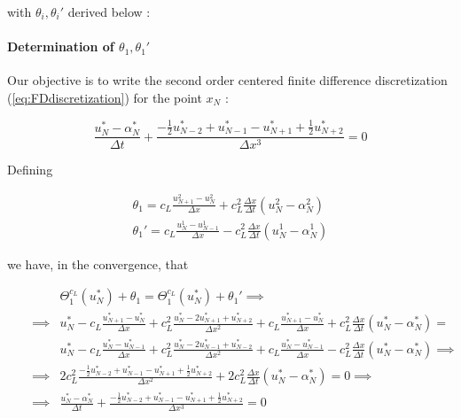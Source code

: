 \noindent with $\theta_i, \theta_i'$ derived below : 


\paragraph{Determination of $\theta_1, \theta_1'$}

\indent Our objective is to write the second order centered finite difference discretization (\ref{eq:FDdiscretization}) for the point $x_{N}$ :

\begin{equation}
    \label{eq:FDdiscretizationN}
    \frac{u_{N}^* - \alpha_{N}^*}{\Delta t} + \frac{-\frac{1}{2}u_{N-2}^* + u_{N-1}^* - u_{N+1}^* + \frac{1}{2}u_{N+2}^* }{\Delta x ^3} = 0
\end{equation}

\indent Defining 

\begin{gather}
    \theta_1 = c_L \frac{u_{N+1}^2 - u_{N}^2}{\Delta x} + c_L^2\frac{\Delta x}{\Delta t} \left( u_{N}^2 - \alpha_{N}^2 \right)\\
    \theta_1' = c_L \frac{u_{N}^1 - u_{N-1}^1}{\Delta x} - c_L^2\frac{\Delta x}{\Delta t} \left( u_{N}^1 - \alpha_{N}^1 \right)
\end{gather}

\indent we have, in the convergence, that

\begin{equation}
\label{eq:modifiedTBC1}
\begin{aligned}
&& &    \Theta_1^{c_L}(u_N^*) + \theta_1 = \Theta_1^{c_L}(u_N^*) + \theta_1'\implies \\
&& \implies &    u_N^* - c_L \frac{u_{N+1}^* - u_N^*}{\Delta x} + c_L^2\frac{u_N^* - 2u_{N+1}^* + u_{N+2}^*}{\Delta x^2} + c_L \frac{u_{N+1}^* - u_{N}^*}{\Delta x} + c_L^2\frac{\Delta x}{\Delta t} \left( u_{N}^* - \alpha_{N}^* \right) = \\
&& & u_N^* - c_L \frac{u_{N}^* - u_{N-1}^*}{\Delta x} + c_L^2\frac{u_N^* - 2u_{N-1}^* + u_{N-2}^*}{\Delta x^2} + c_L \frac{u_{N}^* - u_{N-1}^*}{\Delta x} - c_L^2\frac{\Delta x}{\Delta t} \left( u_{N}^* - \alpha_{N}^* \right) \implies \\
 && \implies &    2c_L^2 \frac{-\frac{1}{2}u_{N-2}^* + u_{N-1}^* - u_{N+1}^* + \frac{1}{2}u_{N+2}^* }{\Delta x ^2}  +             2c_L^2\frac{\Delta x}{\Delta t} \left( u_{N}^* - \alpha_{N}^* \right) = 0 \implies \\
&& \implies &    \frac{u_{N}^* - \alpha_{N}^*}{\Delta t} + \frac{-\frac{1}{2}u_{N-2}^* + u_{N-1}^* - u_{N+1}^* + \frac{1}{2}u_{N+2}^* }{\Delta x ^3} = 0
\end{aligned}
\end{equation}

